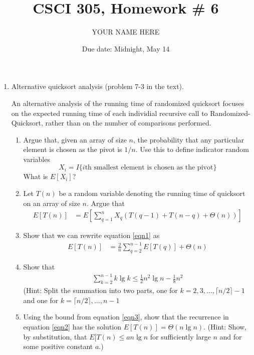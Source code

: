 \documentclass{article}
\title{CSCI 305, Homework \# 6}
\author{YOUR NAME HERE}
\date{Due date:  Midnight, May 14}
\begin{document}
\maketitle

\begin{enumerate}
\item Alternative quicksort analysis (problem 7-3 in the text).

  An alternative analysis of the running time of randomized quicksort
  focuses on the expected running time of each individial recursive
  call to {\sc Randomized-Quicksort}, rather than on the number of
  comparisons performed.

  \begin{enumerate}
    \item Argue that, given an array of size $n$, the probability that
      any particular element is chosen as the pivot is $1/n$.  Use
      this to define indicator random variables
      \[
      X_i = I\{\mbox{$i$th smallest element is chosen as the pivot}\}
      \]
      What is $E[X_i]$?

    \item
      Let $T(n)$ be a random variable denoting the running time of
      quicksort on an array of size $n$.  Argue that
      \begin{align}
      E[T(n)] &= E\left[
        \sum_{q=1}^n X_q(T(q-1) + T(n-q) + \Theta(n))
        \right]
      \label{eqn1}
      \end{align}

    \item
      Show that we can rewrite equation \ref{eqn1} as
      \begin{align}
        E[T(n)] &= \frac{2}{n}\sum_{q=2}^{n-1}E[T(q)] + \Theta(n)
          \label{eqn2}
      \end{align}

    \item
      Show that
      \begin{align}
        \sum_{k=2}^{n-1} k \lg k \leq \frac{1}{2}n^2\lg n -
        \frac{1}{8} n^2
        \label{eqn3}
      \end{align}
      (Hint: Split the summation into two parts, one for
      $k=2,3,...,\lceil n/2 \rceil - 1$
      and one for
      $k= \lceil n/2\rceil,...,n-1$

    \item
      Using the bound from equation \ref{eqn3}, show that the
      recurrence in equation \ref{eqn2} has the solution
      $E[T(n)] = \Theta(n\lg n)$.  (Hint: Show, by substitution, that
      $E[T(n)\leq an\lg n$ for sufficiently large $n$ and for some
        positive constant $a$.) 

  \end{enumerate}
\end{enumerate}
\end{document}
